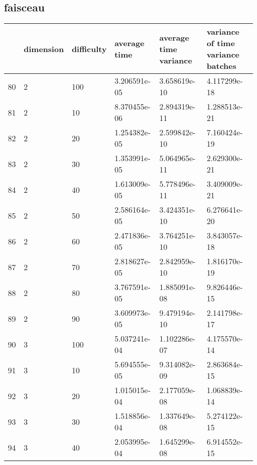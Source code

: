 \documentclass{article}
\begin{document}
\subsection{faisceau}
\begin{center}
\begin{tabular}{llllll}
\toprule
{} & dimension & difficulty &  average time & average time variance & variance of time variance batches \\
\midrule
80 &         2 &        100 &  3.206591e-05 &          3.658619e-10 &                      4.117299e-18 \\
81 &         2 &         10 &  8.370455e-06 &          2.894319e-11 &                      1.288513e-21 \\
82 &         2 &         20 &  1.254382e-05 &          2.599842e-10 &                      7.160424e-19 \\
83 &         2 &         30 &  1.353991e-05 &          5.064965e-11 &                      2.629300e-21 \\
84 &         2 &         40 &  1.613009e-05 &          5.778496e-11 &                      3.409009e-21 \\
85 &         2 &         50 &  2.586164e-05 &          3.424351e-10 &                      6.276641e-20 \\
86 &         2 &         60 &  2.471836e-05 &          3.764251e-10 &                      3.843057e-18 \\
87 &         2 &         70 &  2.818627e-05 &          2.842959e-10 &                      1.816170e-19 \\
88 &         2 &         80 &  3.767591e-05 &          1.885091e-08 &                      9.826446e-15 \\
89 &         2 &         90 &  3.609973e-05 &          9.479194e-10 &                      2.141798e-17 \\
90 &         3 &        100 &  5.037241e-04 &          1.102286e-07 &                      4.175570e-14 \\
91 &         3 &         10 &  5.694555e-05 &          9.314082e-09 &                      2.863684e-15 \\
92 &         3 &         20 &  1.015015e-04 &          2.177059e-08 &                      1.068839e-14 \\
93 &         3 &         30 &  1.518856e-04 &          1.337649e-08 &                      5.274122e-15 \\
94 &         3 &         40 &  2.053995e-04 &          1.645299e-08 &                      6.914552e-15 \\

\end{tabular}
\end{center}
\end{document}
